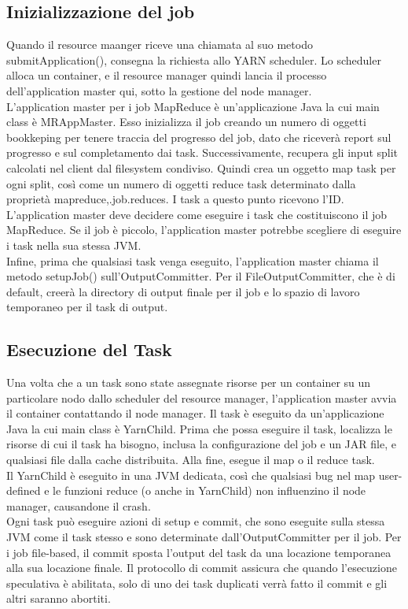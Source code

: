 \subsection{Inizializzazione del job}
Quando il resource maanger riceve una chiamata al suo metodo submitApplication(), consegna la richiesta allo YARN scheduler. Lo scheduler alloca un container, e il resource manager quindi lancia il processo dell'application master qui, sotto la gestione del node manager. \\
L'application master per i job MapReduce è un'applicazione Java la cui main class è MRAppMaster. Esso inizializza il job creando un numero di oggetti bookkeping per tenere traccia del progresso del job, dato che riceverà report sul progresso e sul completamento dai task. Successivamente, recupera gli input split calcolati nel client dal filesystem condiviso. Quindi crea un oggetto map task per ogni split, così come un numero di oggetti reduce task determinato dalla proprietà mapreduce,.job.reduces. I task a questo punto ricevono l'ID. \\
L'application master deve decidere come eseguire i task che costituiscono il job MapReduce. Se il job è piccolo, l'application master potrebbe scegliere di eseguire i task nella sua stessa JVM. \\
Infine, prima che qualsiasi task venga eseguito, l'application master chiama il metodo setupJob() sull'OutputCommitter. Per il FileOutputCommitter, che è di default, creerà la directory di output finale per il job e lo spazio di lavoro temporaneo per il task di output.
\subsection{Esecuzione del Task}
Una volta che a un task sono state assegnate risorse per un container su un particolare nodo dallo scheduler del resource manager, l'application master avvia il container contattando il node manager. Il task è eseguito da un'applicazione Java la cui main class è YarnChild. Prima che possa eseguire il task, localizza le risorse di cui il task ha bisogno, inclusa la configurazione del job e un JAR file, e qualsiasi file dalla cache distribuita. Alla fine, esegue il map o il reduce task. \\
Il YarnChild è eseguito in una JVM dedicata, così che qualsiasi bug nel map user-defined e le funzioni reduce (o anche in YarnChild) non influenzino il node manager, causandone il crash. \\
Ogni task può eseguire azioni di setup e commit, che sono eseguite sulla stessa JVM come il task stesso e sono determinate dall'OutputCommitter per il job. Per i job file-based, il commit sposta l'output del task da una locazione temporanea alla sua locazione finale. Il protocollo di commit assicura che quando l'esecuzione speculativa è abilitata, solo di uno dei task duplicati verrà fatto il commit e gli altri saranno abortiti.
